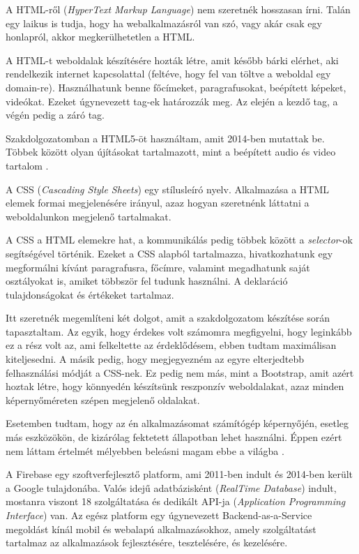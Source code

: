 A HTML-ről (\textit{HyperText Markup Language}) nem szeretnék hosszasan írni. Talán egy laikus is tudja, hogy ha webalkalmazásról van szó, vagy akár csak egy honlapról, akkor megkerülhetetlen a HTML.

A HTML-t weboldalak készítésére hozták létre, amit később bárki elérhet, aki rendelkezik internet kapcsolattal (feltéve, hogy fel van töltve a weboldal egy domain-re). Használhatunk benne főcímeket, paragrafusokat, beépített képeket, videókat. Ezeket úgynevezett tag-ek határozzák meg. Az elején a kezdő tag, a végén pedig a záró tag.

Szakdolgozatomban a HTML5-öt használtam, amit 2014-ben mutattak be. Többek között olyan újításokat tartalmazott, mint a beépített audio és video tartalom
\cite{web}.


A CSS (\textit{Cascading Style Sheets}) egy stílusleíró nyelv. Alkalmazása a HTML elemek formai megjelenésére irányul, azaz hogyan szeretnénk láttatni a weboldalunkon megjelenő tartalmakat.

A CSS a HTML elemekre hat, a kommunikálás pedig többek között a \textit{selector}-ok segítségével történik. Ezeket a CSS alapból tartalmazza, hivatkozhatunk egy megformálni kívánt paragrafusra, főcímre, valamint megadhatunk saját osztályokat is, amiket többször fel tudunk használni. A deklaráció tulajdonságokat és értékeket tartalmaz.

Itt szeretnék megemlíteni két dolgot, amit a szakdolgozatom készítése során tapasztaltam. Az egyik, hogy érdekes volt számomra megfigyelni, hogy leginkább ez a rész volt az, ami felkeltette az érdeklődésem, ebben tudtam maximálisan kiteljesedni. A másik pedig, hogy megjegyezném az egyre elterjedtebb felhasználási módját a CSS-nek. Ez pedig nem más, mint a Bootstrap, amit azért hoztak létre, hogy könnyedén készítsünk reszponzív weboldalakat, azaz minden képernyőméreten szépen megjelenő oldalakat.

Esetemben tudtam, hogy az én alkalmazásomat számítógép képernyőjén, esetleg más eszközökön, de kizárólag fektetett állapotban lehet használni. Éppen ezért nem láttam értelmét mélyebben beleásni magam ebbe a világba
\cite{web}.


A Firebase egy szoftverfejlesztő platform, ami 2011-ben indult és 2014-ben került a Google tulajdonába. Valós idejű adatbázisként (\textit{RealTime Database}) indult, mostanra viszont 18 szolgáltatása és dedikált API-ja (\textit{Application Programming Interface}) van. Az egész platform egy úgynevezett Backend-as-a-Service megoldást kínál mobil és webalapú alkalmazásokhoz, amely szolgáltatást tartalmaz az alkalmazások fejlesztésére, tesztelésére, és kezelésére. 


